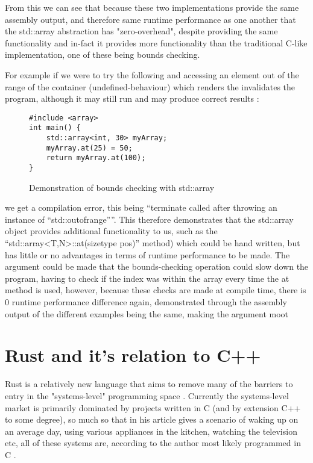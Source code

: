 \documentclass{article}
\begin{document}
From this we can see that because these two implementations provide the same assembly output, and therefore same runtime performance as one another that the std::array abstraction has "zero-overhead", despite providing the same functionality and in-fact it provides more functionality than the traditional C-like implementation, one of these being bounds checking.

For example if we were to try the following and accessing an element out of the range of the container (undefined-behaviour) which renders the invalidates the program, although it may still run and may produce correct results \cite{cpp-reference-ub}:

\begin{figure}[H]
	\begin{lstlisting}
#include <array>
int main() {
    std::array<int, 30> myArray;
    myArray.at(25) = 50;
    return myArray.at(100);
}
 	\end{lstlisting}
	\caption{Demonstration of bounds checking with std::array}
\end{figure}

we get a compilation error, this being ``terminate called after throwing an instance of ``std::out\textunderscore of\textunderscore range''''. This therefore demonstrates that the std::array object provides additional functionality to us, such as the ``std::array\textless T,N\textgreater::at(size\textunderscore type pos)'' method) which could be hand written, but has little or no advantages in terms of runtime performance to be made.
The argument could be made that the bounds-checking operation could slow down the program, having to check if the index was within the array every time the at method is used, however, because these checks are made at compile time, there is 0 runtime performance difference again, demonstrated through the assembly output of the different examples being the same, making the argument moot

\section{Rust and it's relation to C++}
Rust is a relatively new language that aims to remove many of the barriers to entry in the	"systems-level" programming space \textcite{rust-book1}. Currently the systems-level market is primarily dominated by projects written in C (and by extension C++ to some degree), so much so that in his article  \citeauthor{c-language-blog} gives a scenario of waking up on an average day, using various appliances in the kitchen, watching the television etc, all of these systems are, according to the author most likely programmed in C \cite{c-language-blog}.
\end{document}
